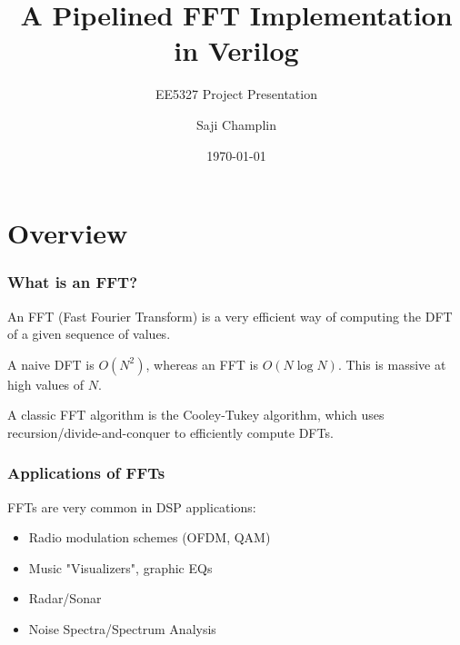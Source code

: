 \documentclass{beamer}
\title[Pipelined FFT]{A Pipelined FFT Implementation in Verilog}
\author{Saji Champlin}
\institute{University of Minnesota}
\date{\today}
\subtitle{EE5327 Project Presentation}
\begin{document}
\frame{\titlepage}

\section{Overview}

\begin{frame}
	\frametitle{What is an FFT?}

	An FFT (Fast Fourier Transform) is a very efficient way of computing
	the DFT of a given sequence of values.

	A naive DFT is $O(N^2)$, whereas an FFT is $O(N \log{N})$. This is
	massive at high values of $N$.

	A classic FFT algorithm is the Cooley-Tukey algorithm, which uses
	recursion/divide-and-conquer to efficiently compute DFTs.

\end{frame}


\begin{frame}
	\frametitle{Applications of FFTs}
	FFTs are very common in DSP applications:

	\begin{itemize}
		\item Radio modulation schemes (OFDM, QAM)
		\item Music "Visualizers", graphic EQs
		\item Radar/Sonar
		\item Noise Spectra/Spectrum Analysis
	\end{itemize}
\end{frame}
\end{document}
